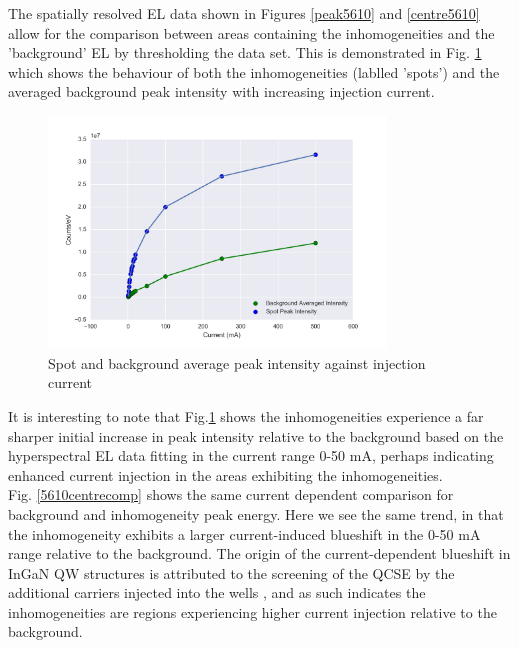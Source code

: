 \FloatBarrier

The spatially resolved EL data shown in Figures \ref{peak5610} and \ref{centre5610} allow for the comparison between areas containing the inhomogeneities and the 'background' EL by thresholding the data set. This is demonstrated in Fig. \ref{5610peakcomp} which shows the behaviour of both the inhomogeneities (lablled 'spots') and the averaged background peak intensity with increasing injection current.
\begin{figure}[!ht]
	\centering
	\includegraphics[width=0.8\textwidth]{Figs/Ch3/Peakcomp5610.png}
	\caption[h] {Spot and background average peak intensity against injection current}
	\label{5610peakcomp}
\end{figure}

\FloatBarrier 
It is interesting to note that Fig.\ref{5610peakcomp} shows the inhomogeneities experience a far sharper initial increase in peak intensity relative to the background based on the hyperspectral EL data fitting in the current range 0-50 mA, perhaps indicating enhanced current injection in the areas exhibiting the inhomogeneities.\\
Fig. \ref{5610centrecomp} shows the same current dependent comparison for background and inhomogeneity peak energy. Here we see the same trend, in that the inhomogeneity exhibits a larger current-induced blueshift in the 0-50 mA range relative to the background. The origin of the current-dependent blueshift in InGaN QW structures is attributed to the screening of the QCSE by the additional carriers injected into the wells \cite{Ryou2009}, and as such indicates the inhomogeneities are regions experiencing higher current injection relative to the background.

